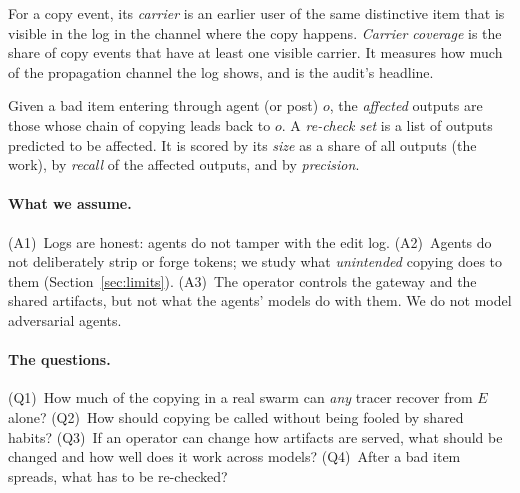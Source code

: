\begin{definition}\label{def:coverage}
For a copy event, its \emph{carrier} is an earlier user of the same distinctive item that is visible in the log in the channel where the copy happens. \emph{Carrier coverage} is the share of copy events that have at least one visible carrier. It measures how much of the propagation channel the log shows, and is the audit's headline.
\end{definition}

\begin{definition}\label{def:recheck}
Given a bad item entering through agent (or post) $o$, the \emph{affected} outputs are those whose chain of copying leads back to $o$. A \emph{re-check set} is a list of outputs predicted to be affected. It is scored by its \emph{size} as a share of all outputs (the work), by \emph{recall} of the affected outputs, and by \emph{precision}.
\end{definition}

\paragraph{What we assume.}
(A1)~Logs are honest: agents do not tamper with the edit log. (A2)~Agents do not deliberately strip or forge tokens; we study what \emph{unintended} copying does to them (Section~\ref{sec:limits}). (A3)~The operator controls the gateway and the shared artifacts, but not what the agents' models do with them. We do not model adversarial agents.

\paragraph{The questions.}
(Q1)~How much of the copying in a real swarm can \emph{any} tracer recover from $E$ alone? (Q2)~How should copying be called without being fooled by shared habits? (Q3)~If an operator can change how artifacts are served, what should be changed and how well does it work across models? (Q4)~After a bad item spreads, what has to be re-checked?
